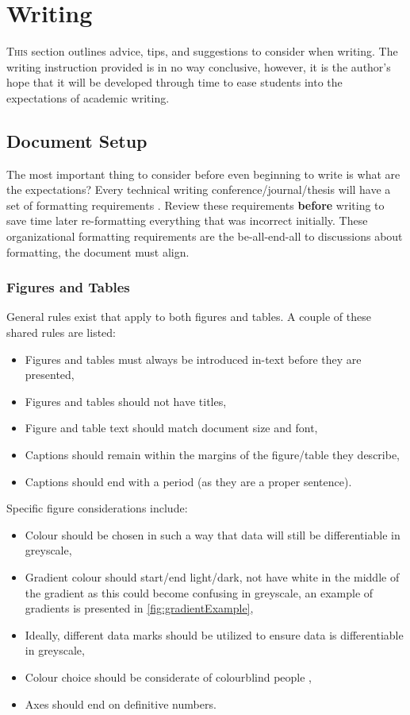 \section{Writing}

\lettrine{T}{his} section outlines advice, tips, and suggestions to consider when writing. 
The writing instruction provided is in no way conclusive, however, it is the author's hope that it will be developed through time to ease students into the expectations of academic writing. 

\subsection{Document Setup}

The most important thing to consider before even beginning to write is what are the expectations? 
Every technical writing conference/journal/thesis will have a set of formatting requirements \cite{writingAIAA,writingThesisUofC}. 
Review these requirements \textbf{before} writing to save time later re-formatting everything that was incorrect initially. 
These organizational formatting requirements are the be-all-end-all to discussions about formatting, the document must align. 

\subsubsection{Figures and Tables}

General rules exist that apply to both figures and tables. A couple of these shared rules are listed: 
\begin{itemize}
	\item Figures and tables must always be introduced in-text before they are presented, 
	\item Figures and tables should not have titles, 
	\item Figure and table text should match document size and font, 
	\item Captions should remain within the margins of the figure/table they describe, 
	\item Captions should end with a period (as they are a proper sentence).
\end{itemize}

\noindent
Specific figure considerations include: 
\begin{itemize}
	\item Colour should be chosen in such a way that data will still be differentiable in greyscale,
	\item Gradient colour should start/end light/dark, not have white in the middle of the gradient as this could become confusing in greyscale, an example of gradients is presented in \cref{fig:gradientExample},
	\item Ideally, different data marks should be utilized to ensure data is differentiable in greyscale, 
	\item Colour choice should be considerate of colourblind people \cite{colourScienceMisuse},
	\item Axes should end on definitive numbers. 
\end{itemize}

